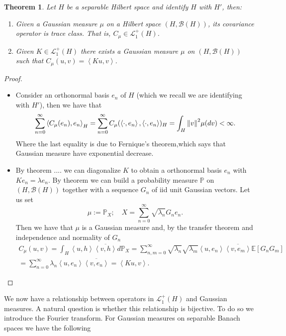 \documentclass[12pt]{article}
\newcommand{\br}[1]{\left\langle#1\right\rangle}
\newcommand{\E}{\mathbb{E}}
\newcommand{\Bb}{\mathcal{B}}
\newcommand{\Ll}{\mathcal{L}}
\newtheorem{theorem}{Theorem}
\begin{document}
\begin{theorem} Let $H$ be a separable Hilbert space and identify  $H$ with $H'$, then:
	\begin{enumerate}
		\item Given a Gaussian measure $\mu $ on a Hilbert space $(H,\Bb(H))$, its covariance operator is trace class. That is, $C_\mu \in \Ll_1^+(H)$.
		\item Given $K\in \Ll_1^+(H)$ there exists a Gaussian measure $\mu $ on $(H,\Bb(H))$ such that $C_\mu(u,v)=\br{Ku ,v}$.
	\end{enumerate}
\end{theorem}
\begin{proof}
	\begin{itemize}
		\item Consider an orthonormal basis $e_n$ of $H$ (which we recall we are identifying with $H'$), then we have that
		      \begin{equation*}
			      \sum_{n=0}^{\infty} \br{C_\mu (e_n),e_n}_H=\sum_{n=0}^{\infty} C_\mu (\br{\cdot ,e_n},\br{\cdot ,e_n})_H=\int_{H}\norm{v}^2 \mu (dv)<\infty.
		      \end{equation*}
		      Where the last equality is due to Fernique's theorem,which says that Gaussian measure have exponential decrease.
		\item By theorem .... we can diagonalize $K$ to obtain a orthonormal basis  $e_n$ with  $Ke_n=\lambda e_n$. By theorem we can build a probability measure $\mathbb{P}$ on $(H,\Bb(H))$ together with a sequence $G_n$ of iid unit Gaussian vectors. Let us set
		      \begin{equation*}
			      \mu :=\mathbb{P}_X;\quad X=\sum_{n=0}^{\infty} \sqrt{\lambda _n} G_ne_n .
		      \end{equation*}
		      Then we have that $\mu $ is a Gaussian measure and, by the transfer theorem and independence and normality of $G_n$
		      \begin{multline*}
			      C_\mu (u,v)=\int_{H}\br{u,h}\overline{\br{v,h}} d\mathbb{P}_X=\sum_{n,m=0}^{\infty}\sqrt{\lambda_n}\sqrt{\lambda_m}  \br{u,e_n}\overline{\br{v,e_m}}\E[G_nG_m]\\
			      =\sum_{n=0}^{\infty}\lambda_n\br{u,e_n}\overline{\br{v,e_n}}=\br{Ku,v}.
		      \end{multline*}

	\end{itemize}
\end{proof}
We now have a relationship between operators in $\Ll_1^+(H)$ and Gaussian measures. A natural question is whether this relationship is bijective. To do so we introduce the Fourier transform. For Gaussian measures on separable Banach spaces we have the following
\end{document}
